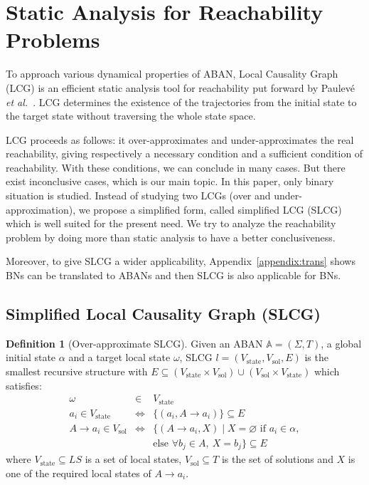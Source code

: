 \documentclass{article}
\theoremstyle{definition}
\newtheorem{definition}{Definition}
\newcommand{\st}{{\mathrm{state}}}
\newcommand{\sol}{{\mathrm{sol}}}
\begin{document}
\section{Static Analysis for Reachability Problems}\label{sect:3}
To approach various dynamical properties of ABAN, Local Causality Graph (LCG) is an efficient static analysis tool for reachability put forward by Paulev\'e \textit{et al.}~\cite{pauleve2011}. 
LCG determines the existence of the trajectories from the initial state to the target state without traversing the whole state space.

LCG proceeds as follows: it over-approximates and under-approximates the real reachability, giving respectively a necessary condition and a sufficient condition of reachability. 
With these conditions, we can conclude in many cases.
But there exist inconclusive cases, which is our main topic.
In this paper, only binary situation is studied.
Instead of studying two LCGs (over and under-approximation), we propose a simplified form, called simplified LCG (SLCG) which is well suited for the present need.
We try to analyze the reachability problem by doing more than static analysis to have a better conclusiveness.

Moreover, to give SLCG a wider applicability, Appendix~\ref{appendix:trans} shows BNs can be translated to ABANs and then SLCG is also applicable for BNs.

\subsection{Simplified Local Causality Graph (SLCG)}
\begin{definition}[Over-approximate SLCG]\label{defSLCG}
Given an ABAN $\mathbb{A} = (\Sigma,T)$, a global initial state $\alpha$ and a target local state $\omega$, SLCG $l= (V_\st,V_\sol,E)$ is the smallest recursive structure with $E \subseteq (V_\st\times V_\sol)\cup (V_\sol\times V_\st)$ which satisfies:
\begin{eqnarray*}
    \omega&\in& V_\st \\
    a_i\in V_\st &\Leftrightarrow& \{ (a_i, A\to a_i)\}\subseteq E \\
    A\to a_i\in V_\sol&\Leftrightarrow& \{ (A\to a_i,X)\mid X= \varnothing \text{ if } a_i\in \alpha,\\
    &&\text{else }\forall b_j\in A,\ X= b_j\}\subseteq E
\end{eqnarray*}
where $V_\st\subseteq LS$ is a set of local states, $V_\sol\subseteq T$ is the set of solutions and $X$ is one of the required local states of $A\to a_i$.
\end{definition}
\end{document}
